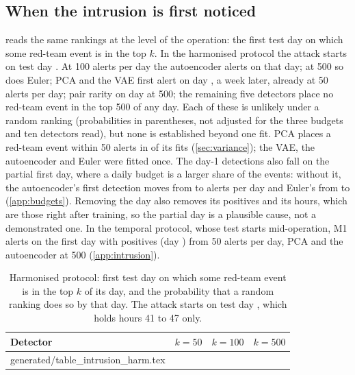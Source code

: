 \documentclass[11pt,a4paper]{article}
\makeatletter
\newcommand{\tablerows}[1]{\@@input #1 }
\makeatother
\begin{document}
\subsection{When the intrusion is first noticed}
\label{sec:intrusion}
 reads the same rankings at the level of the operation: the first test day on which some red-team event is in the top $k$. In the harmonised protocol the attack starts on test day \HarmAttackFirstDay{}. At 100 alerts per day the autoencoder alerts on that day; at 500 so does Euler; PCA and the VAE first alert on day \HarmPcaIntrusionDayFifty{}, a week later, already at 50 alerts per day; pair rarity on day \HarmPairRarityIntrusionDayFiveHundred{} at 500; the remaining five detectors place no red-team event in the top 500 of any day. Each of these is unlikely under a random ranking (probabilities in parentheses, not adjusted for the three budgets and ten detectors read), but none is established beyond one fit. PCA places a red-team event within 50 alerts in \HarmPcaFitWithinFifty{} of its \HarmFitSeeds{} fits (\cref{sec:variance}); the VAE, the autoencoder and Euler were fitted once. The day-1 detections also fall on the partial first day, where a daily budget is a larger share of the events: without it, the autoencoder's first detection moves from \HarmAutoencoderFirstDetection{} to \HarmAutoencoderFirstWithoutDayOne{} alerts per day and Euler's from \HarmEulerFirstDetection{} to \HarmEulerFirstWithoutDayOne{} (\cref{app:budgets}). Removing the day also removes its positives and its hours, which are those right after training, so the partial day is a plausible cause, not a demonstrated one. In the temporal protocol, whose test starts mid-operation, M1 alerts on the first day with positives (day \TempAttackFirstDay{}) from 50 alerts per day, PCA and the autoencoder at 500 (\cref{app:intrusion}).

\begin{table}[t]
\centering
\small
\begin{threeparttable}
\caption{Harmonised protocol: first test day on which some red-team event is in the top $k$ of its day, and the probability that a random ranking does so by that day. The attack starts on test day \HarmAttackFirstDay{}, which holds hours 41 to 47 only.}
\label{tab:intrusion}
\begin{tabular}{@{}lrrr@{}}
\toprule
Detector & $k = 50$ & $k = 100$ & $k = 500$ \\
\midrule
\tablerows{generated/table_intrusion_harm.tex}
\bottomrule
\end{tabular}
\end{threeparttable}
\end{table}
\end{document}
